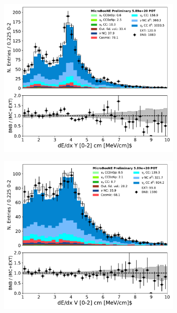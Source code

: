 \begin{figure}[H] 
\begin{center}
    \begin{subfigure}[b]{0.3\textwidth}
    \centering
    \includegraphics[width=1.00\textwidth]{pi0/calorimetry/shr_tkfit_2cm_dedx_Y_03112020_ALL_scaled.pdf}
    \caption{}
    \end{subfigure}
    \begin{subfigure}[b]{0.3\textwidth}
    \centering
    \includegraphics[width=1.00\textwidth]{pi0/calorimetry/shr_tkfit_2cm_dedx_V_03112020_ALL_scaled.pdf}

\end{subfigure}
\end{center}
\end{figure}
